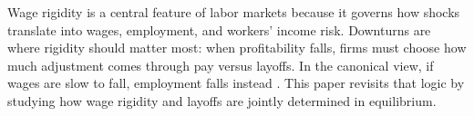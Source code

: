 
Wage rigidity is a central feature of labor markets because it governs how shocks translate into wages, employment, and workers’ income risk. Downturns are where rigidity should matter most: when profitability falls, firms must choose how much adjustment comes through pay versus layoffs. In the canonical view, if wages are slow to fall, employment falls instead \parencite[]{keynes1936}. This paper revisits that logic by studying how wage rigidity and layoffs are jointly determined in equilibrium.

